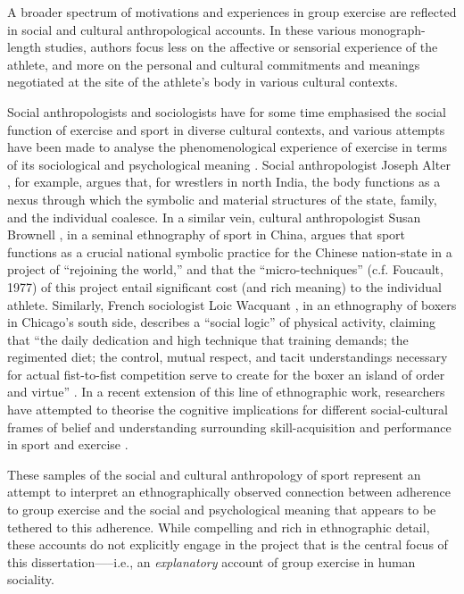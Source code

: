 A broader spectrum of motivations and experiences in group exercise are reflected in social and cultural anthropological accounts. In these various monograph-length studies, authors focus less on the affective or sensorial experience of the athlete, and more on the personal and cultural commitments and meanings negotiated at the site of the athlete’s body in various cultural contexts.

Social anthropologists and sociologists have for some time emphasised the social function of exercise and sport in diverse cultural contexts, and various attempts have been made to analyse the phenomenological experience of exercise in terms of its sociological and psychological meaning \citep{Bourdieu1978}.  Social anthropologist Joseph Alter \textcite{Alter1993}, for example, argues that, for wrestlers in north India, the body functions as a nexus through which the symbolic and material structures of the state, family, and the individual coalesce.  In a similar vein, cultural anthropologist Susan Brownell \textcite{Bronwell1995}, in a seminal ethnography of sport in China, argues that sport functions as a crucial national symbolic practice for the Chinese nation-state in a project of ``rejoining the world,'' and that the ``micro-techniques'' (c.f. Foucault, 1977) of this project entail significant cost (and rich meaning) to the individual athlete.   Similarly, French sociologist Loic Wacquant \textcite{Wacquant2004}, in an ethnography of boxers in Chicago’s south side, describes a ``social logic'' of physical activity, claiming that ``the daily dedication and high technique that training demands; the regimented diet; the control, mutual respect, and tacit understandings necessary for actual fist-to-fist competition serve to create for the boxer an island of order and virtue'' \textcite[17]{Wacquant2004}.  In a recent extension of this line of ethnographic work, researchers have attempted to theorise the cognitive implications for different social-cultural frames of belief and understanding surrounding skill-acquisition and performance in sport and exercise \citep{Downey2005bDowney2007,Marchand2010}.

These samples of the social and cultural anthropology of sport represent an attempt to interpret an ethnographically observed connection between adherence to group exercise and the social and psychological meaning that appears to be tethered to this adherence.  While compelling and rich in ethnographic detail, these accounts do not explicitly engage in the project that is the central focus of this dissertation—--i.e., an \textit{explanatory} account of group exercise in human sociality.

